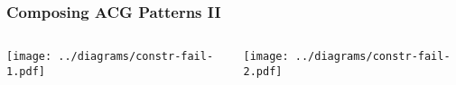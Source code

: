 \documentclass{beamer}
\begin{document}
\begin{frame}
  \frametitle{Composing ACG Patterns II}

  \begin{columns}[c]
    \begin{column}{0.5\textwidth}
      \begin{center}
        \texttt{[image: ../diagrams/constr-fail-1.pdf]}
      \end{center}
    \end{column}
    \begin{column}{0.5\textwidth}
      \begin{center}
        \texttt{[image: ../diagrams/constr-fail-2.pdf]}
      \end{center}
    \end{column}
  \end{columns}
\end{frame}
\end{document}

